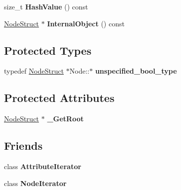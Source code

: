 \begin{DoxyCompactItemize}
\item 
\hypertarget{classphys_1_1xml_1_1Node_a935f818f5266d68c9d01eab52590f119}{
size\_\-t {\bfseries HashValue} () const }
\label{d7/d0a/classphys_1_1xml_1_1Node_a935f818f5266d68c9d01eab52590f119}

\item 
\hypertarget{classphys_1_1xml_1_1Node_a403f76627bf3bd70b78833ab90340cf6}{
\hyperlink{structphys_1_1xml_1_1NodeStruct}{NodeStruct} $\ast$ {\bfseries InternalObject} () const }
\label{d7/d0a/classphys_1_1xml_1_1Node_a403f76627bf3bd70b78833ab90340cf6}

\end{DoxyCompactItemize}
\subsection*{Protected Types}
\begin{DoxyCompactItemize}
\item 
\hypertarget{classphys_1_1xml_1_1Node_abace2c2c7e70431d920579917417c1e4}{
typedef \hyperlink{structphys_1_1xml_1_1NodeStruct}{NodeStruct} $\ast$Node::$\ast$ {\bfseries unspecified\_\-bool\_\-type}}
\label{d7/d0a/classphys_1_1xml_1_1Node_abace2c2c7e70431d920579917417c1e4}

\end{DoxyCompactItemize}
\subsection*{Protected Attributes}
\begin{DoxyCompactItemize}
\item 
\hypertarget{classphys_1_1xml_1_1Node_a709eb0cd1c82c1d8e50831dec6c96419}{
\hyperlink{structphys_1_1xml_1_1NodeStruct}{NodeStruct} $\ast$ {\bfseries \_\-GetRoot}}
\label{d7/d0a/classphys_1_1xml_1_1Node_a709eb0cd1c82c1d8e50831dec6c96419}

\end{DoxyCompactItemize}
\subsection*{Friends}
\begin{DoxyCompactItemize}
\item 
\hypertarget{classphys_1_1xml_1_1Node_a1ed8790083a80b2604beba1c666bce6e}{
class {\bfseries AttributeIterator}}
\label{d7/d0a/classphys_1_1xml_1_1Node_a1ed8790083a80b2604beba1c666bce6e}

\item 
\hypertarget{classphys_1_1xml_1_1Node_ac5a1d2c6036b7ba1894a7c3b8d96a312}{
class {\bfseries NodeIterator}}
\label{d7/d0a/classphys_1_1xml_1_1Node_ac5a1d2c6036b7ba1894a7c3b8d96a312}

\end{DoxyCompactItemize}


